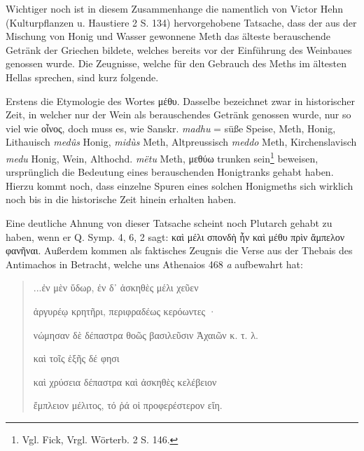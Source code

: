 \documentclass[a4paper, 11pt, oneside]{article}
\begin{document}
Wichtiger noch ist in diesem Zusammenhange die namentlich von Victor Hehn (Kulturpflanzen u. Haustiere 2 S. 134) hervorgehobene Tatsache, dass der aus der Mischung von Honig und Wasser gewonnene Meth das älteste berauschende Getränk der Griechen bildete, welches bereits vor der Einführung des Weinbaues genossen wurde. Die Zeugnisse, welche für den Gebrauch des Meths im ältesten Hellas sprechen, sind kurz folgende.

Erstens die Etymologie des Wortes μέθυ. Dasselbe bezeichnet zwar in historischer Zeit, in welcher nur der Wein als berauschendes Getränk genossen wurde, nur so viel wie οἶνος, doch muss es, wie Sanskr. \emph{madhu} = süße Speise, Meth, Honig, Lithauisch \emph{medûs} Honig, \emph{midùs} Meth, Altpreussisch \emph{meddo} Meth, Kirchenslavisch \emph{medu} Honig, Wein, Althochd. \emph{mëtu} Meth, μεθύω trunken sein\footnote{Vgl. Fick, Vrgl. Wörterb. 2 S. 146.} beweisen, ursprünglich die Bedeutung eines berauschenden Honigtranks gehabt haben. Hierzu kommt noch, dass einzelne Spuren eines solchen Honigmeths sich wirklich noch bis in die historische Zeit hinein erhalten haben.

Eine deutliche Ahnung von dieser Tatsache scheint noch Plutarch gehabt zu haben, wenn er Q. Symp. 4, 6, 2 sagt: καὶ μέλι σπονδὴ ἦν καὶ μέθυ πρὶν ἄμπελον φανῆναι. Außerdem kommen als faktisches Zeugnis die Verse aus der Thebais des Antimachos in Betracht, welche uns Athenaios 468 \emph{a} aufbewahrt hat:
\begin{quotation}
...ἐν μὲν ὕδωρ, ἐν δ᾽ ἀσκηθὲς μέλι χεῦεν

ἀργυρέῳ κρητῆρι, περιφραδέως κερόωντες ·

νώμησαν δὲ δέπαστρα θοῶς βασιλεῦσιν Ἀχαιῶν κ. τ. λ.

\bigskip

\hspace*{15mm}καὶ τοῖς ἑξῆς δέ φησι

καὶ χρύσεια δέπαστρα καὶ ἀσκηθὲς κελέβειον

ἔμπλειον μέλιτος, τό ῥά οἱ προφερέστερον εἴη.
\end{quotation}
\end{document}
